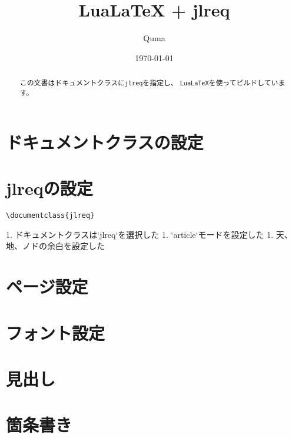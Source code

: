 \documentclass{jlreq}
\title{LuaLaTeX + jlreq}
\author{Quma}
\date{\today}
\begin{document}
\maketitle

\begin{abstract}
この文書はドキュメントクラスに\texttt{jlreq}を指定し、
\texttt{LuaLaTeX}を使ってビルドしています。
\end{abstract}

\tableofcontents

\section{ドキュメントクラスの設定}

\section{jlreqの設定}

\begin{verbatim}
\documentclass{jlreq}
\end{verbatim}

\begin{markdown}
1. ドキュメントクラスは`jlreq`を選択した
1. `article`モードを設定した
1. 天、地、ノドの余白を設定した
\end{markdown}



\section{ページ設定}




\section{フォント設定}




\section{見出し}


\section{箇条書き}




\end{document}
